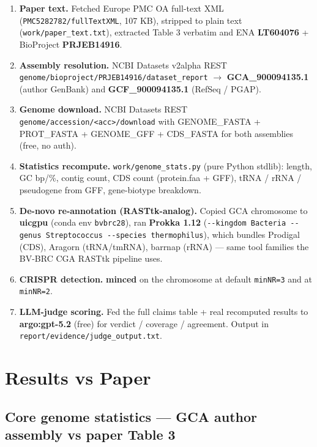 \documentclass[11pt]{article}
\begin{document}
\begin{enumerate}[leftmargin=*, itemsep=2pt]
  \item \textbf{Paper text.} Fetched Europe PMC OA full-text XML
  (\texttt{PMC5282782/fullTextXML}, 107 KB), stripped to plain text
  (\texttt{work/paper\_text.txt}), extracted Table 3 verbatim and ENA \textbf{LT604076} +
  BioProject \textbf{PRJEB14916}.
  \item \textbf{Assembly resolution.} NCBI Datasets v2alpha REST
  \texttt{genome/bioproject/PRJEB14916/dataset\_report} $\rightarrow$ \textbf{GCA\_900094135.1}
  (author GenBank) and \textbf{GCF\_900094135.1} (RefSeq / PGAP).
  \item \textbf{Genome download.} NCBI Datasets REST
  \texttt{genome/accession/<acc>/download} with GENOME\_FASTA + PROT\_FASTA + GENOME\_GFF +
  CDS\_FASTA for both assemblies (free, no auth).
  \item \textbf{Statistics recompute.} \texttt{work/genome\_stats.py} (pure Python stdlib):
  length, GC bp/\%, contig count, CDS count (protein.faa + GFF), tRNA / rRNA / pseudogene from
  GFF, gene-biotype breakdown.
  \item \textbf{De-novo re-annotation (RASTtk-analog).} Copied GCA chromosome to \textbf{uicgpu}
  (conda env \texttt{bvbrc28}), ran \textbf{Prokka 1.12}
  (\texttt{-{}-kingdom Bacteria -{}-genus Streptococcus -{}-species thermophilus}), which bundles
  Prodigal (CDS), Aragorn (tRNA/tmRNA), barrnap (rRNA) --- same tool families the BV-BRC CGA
  RASTtk pipeline uses.
  \item \textbf{CRISPR detection.} \textbf{minced} on the chromosome at default \texttt{minNR=3}
  and at \texttt{minNR=2}.
  \item \textbf{LLM-judge scoring.} Fed the full claims table + real recomputed results to
  \textbf{argo:gpt-5.2} (free) for verdict / coverage / agreement. Output in
  \texttt{report/evidence/judge\_output.txt}.
\end{enumerate}

\section{Results vs Paper}

\subsection{Core genome statistics --- GCA author assembly vs paper Table 3}
\end{document}
